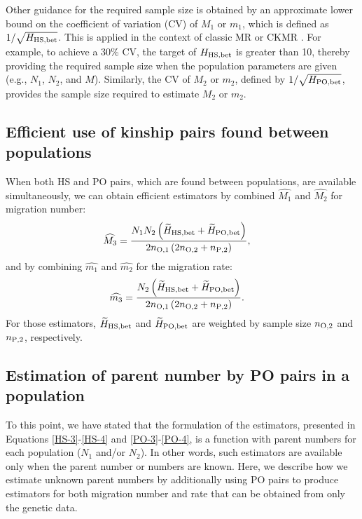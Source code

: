 \documentclass[12pt, English]{article}
\begin{document}
\begin{spacing}{1.9}
Other guidance for the required sample size is obtained by an approximate lower bound on the coefficient of variation (CV) of $M_1$ or $m_1$, which is defined as $1/\sqrt{H_{\rm HS, bet}}$. This is applied in the context of classic MR \cite[]{seber1982estimation} or CKMR \cite[]{bravington2016close}. For example, to achieve a 30\% CV, the target of $H_{\rm HS, bet}$ is greater than 10, thereby providing the required sample size when the population parameters are given (e.g., $N_1$, $N_2$, and $M$). Similarly, the CV of $M_2$ or $m_2$, defined by $1/\sqrt{H_{\rm PO, bet}}$, provides the sample size required to estimate $M_2$ or $m_2$. 

\subsection{Efficient use of kinship pairs found between populations}

When both HS and PO pairs, which are found between populations, are available simultaneously, we can obtain efficient estimators by combined $\widehat{M_1}$ and $\widehat{M_2}$ for migration number: 
\begin{align}
\widehat{M_3} &= \frac{ N_{1} N_{2} \left(\widetilde{H}_{\rm HS,bet} + \widetilde{H}_{\rm PO,bet}\right) } {2n_{\rm O, 1} \left(2 n_{\rm O, 2} + n_{\rm P, 2}\right) },
\label{AP-1}
\end{align}
and by combining $\widehat{m_1}$ and $\widehat{m_2}$ for the migration rate: 
\begin{align}
\widehat{m_3} &= \frac{ N_{2} \left(\widetilde{H}_{\rm HS,bet} + \widetilde{H}_{\rm PO,bet}\right) } {2n_{\rm O, 1} \left(2 n_{\rm O, 2} + n_{\rm P, 2}\right)}.
\label{AP-2}
\end{align}
For those estimators, $\widetilde{H}_{\rm HS,bet}$ and $\widetilde{H}_{\rm PO,bet}$ are weighted by sample size $n_{\rm O, 2}$ and $n_{\rm P, 2}$, respectively. 

\subsection{Estimation of parent number by PO pairs in a population}

To this point, we have stated that the formulation of the estimators, presented in Equations \ref{HS-3}-\ref{HS-4} and \ref{PO-3}-\ref{PO-4}, is a function with parent numbers for each population ($N_1$ and/or $N_2$). In other words, such estimators are available only when the parent number or numbers are known. Here, we describe how we estimate unknown parent numbers by additionally using PO pairs to produce estimators for both migration number and rate that can be obtained from only the genetic data. 


\end{spacing}
\end{document}
